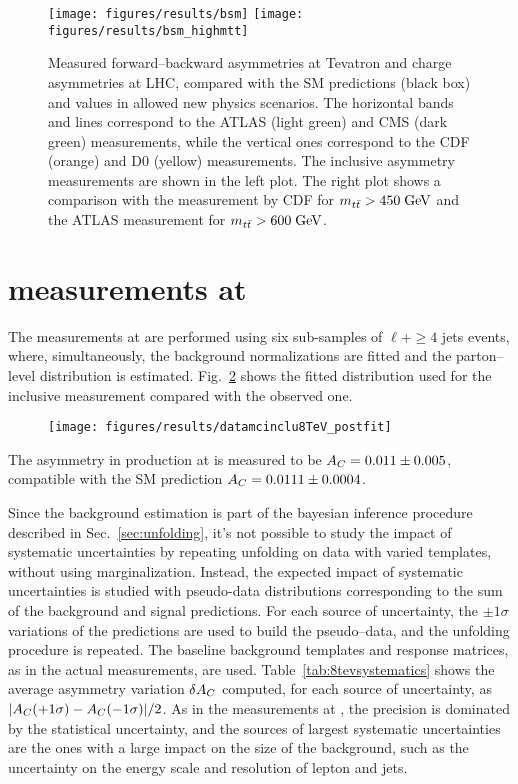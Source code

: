 \begin{figure}[!htb]
  \centering
  \texttt{[image: figures/results/bsm]}
  \texttt{[image: figures/results/bsm\_highmtt]}
  \caption{Measured forward--backward asymmetries \afb{} at Tevatron
    and charge asymmetries \ac{} at LHC, compared with the SM
    predictions (black box) and values in allowed new physics
    scenarios. The horizontal bands and lines correspond to the ATLAS
    (light green) and CMS (dark green) measurements, while the
    vertical ones correspond to the CDF (orange) and D0 (yellow)
    measurements. The inclusive asymmetry measurements are shown in
    the left plot. The right plot shows a comparison with the \afb{}
    measurement by CDF for $m_{t\bar{t}}{} > 450 \; \mathrm{GeV}{}$ and the ATLAS \ac{}
    measurement for $m_{t\bar{t}}{} > 600 \; \mathrm{GeV}{}$.}
  \label{fig:summarybsm}
\end{figure}


\section{\ac{} measurements at \eighttev{}}
\label{sec:res8tev}

The measurements at \eighttev{} are performed using six sub-samples of
$\ell{}+\ge4$ jets events, where, simultaneously, the background normalizations are
fitted and the parton--level \dy{} distribution is
estimated. Fig.~\ref{fig:dy7tev} shows the fitted distribution used
for the inclusive \ac{} measurement compared with the observed one. 

\begin{figure}[!htb]\centering
  \texttt{[image: figures/results/datamcinclu8TeV\_postfit]} 
  \caption{}
  \label{fig:dy7tev}
\end{figure}

The asymmetry \ac{} in \ttbar{} production at \eighttev{} is measured to be
$A_C{}= 0.011\pm0.005$, compatible with the SM prediction
$A_C{}=0.0111\pm0.0004$.

Since the background estimation is part of the bayesian inference
procedure described in Sec.~\ref{sec:unfolding}, it's not possible to
study the impact of systematic uncertainties by repeating unfolding on data with
varied templates, without using marginalization. Instead, the expected
impact of systematic uncertainties is studied with pseudo-data distributions
corresponding to the sum of the background and signal predictions.
For each source of uncertainty, the $\pm{}1\sigma$ variations of the
predictions are used to build the pseudo--data, and the unfolding
procedure is repeated. The baseline background templates and response
matrices, as in the actual measurements, are used.
Table~\ref{tab:8tevsystematics} shows the average asymmetry variation
$\delta{\ensuremath{A_C}{}}$ computed, for each source of uncertainty, as
$|A_C{}(+1\sigma)-A_C{}(-1\sigma)|/2$.
As in the measurements at \seventev{}, the precision is dominated by
the statistical uncertainty, and the sources of largest systematic
uncertainties are the ones with a large impact on the size of the
\wjets{} background, such as the uncertainty on the energy scale and
resolution of lepton and jets. 

